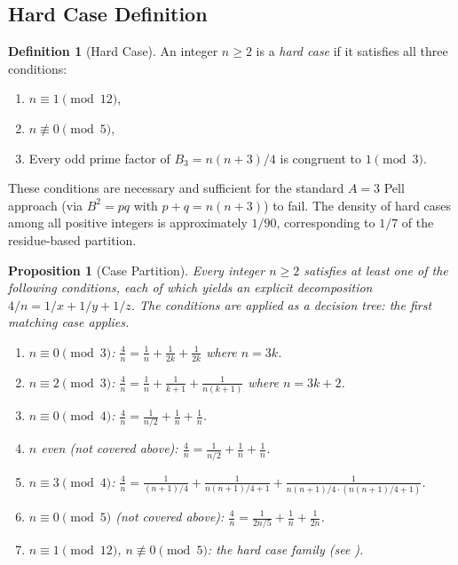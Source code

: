 \documentclass[11pt,a4paper]{article}
\theoremstyle{plain}
\newtheorem{proposition}[theorem]{Proposition}
\theoremstyle{plain}
\theoremstyle{definition}
\newtheorem{definition}[theorem]{Definition}
\numberwithin{equation}{section}
\begin{document}
\subsection{Hard Case Definition}

\begin{definition}[Hard Case]\label{def:hard}
An integer $n \geq 2$ is a \emph{hard case} if it satisfies all three conditions:
\begin{enumerate}[noitemsep]
  \item $n \equiv 1 \pmod{12}$,
  \item $n \not\equiv 0 \pmod{5}$,
  \item Every odd prime factor of $B_3 = n(n+3)/4$ is congruent to $1 \pmod{3}$.
\end{enumerate}
\end{definition}

These conditions are necessary and sufficient for the standard $A = 3$ Pell approach (via $B^2 = pq$ with $p + q = n(n+3)$) to fail. The density of hard cases among all positive integers is approximately $1/90$, corresponding to $1/7$ of the residue-based partition.

\begin{proposition}[Case Partition]\label{prop:partition}
Every integer $n \geq 2$ satisfies at least one of the following conditions, each of which yields an explicit decomposition $4/n = 1/x + 1/y + 1/z$. The conditions are applied as a decision tree: the first matching case applies.
\begin{enumerate}[noitemsep]
  \item $n \equiv 0 \pmod{3}$: $\frac{4}{n} = \frac{1}{n} + \frac{1}{2k} + \frac{1}{2k}$ where $n = 3k$.
  \item $n \equiv 2 \pmod{3}$: $\frac{4}{n} = \frac{1}{n} + \frac{1}{k+1} + \frac{1}{n(k+1)}$ where $n = 3k+2$.
  \item $n \equiv 0 \pmod{4}$: $\frac{4}{n} = \frac{1}{n/2} + \frac{1}{n} + \frac{1}{n}$.
  \item $n$ even (not covered above): $\frac{4}{n} = \frac{1}{n/2} + \frac{1}{n} + \frac{1}{n}$.
  \item $n \equiv 3 \pmod{4}$: $\frac{4}{n} = \frac{1}{(n+1)/4} + \frac{1}{n(n+1)/4 + 1} + \frac{1}{n(n+1)/4 \cdot (n(n+1)/4 + 1)}$.
  \item $n \equiv 0 \pmod{5}$ (not covered above): $\frac{4}{n} = \frac{1}{2n/5} + \frac{1}{n} + \frac{1}{2n}$.
  \item $n \equiv 1 \pmod{12}$, $n \not\equiv 0 \pmod{5}$: the hard case family (see ).
\end{enumerate}
\end{proposition}
\end{document}

